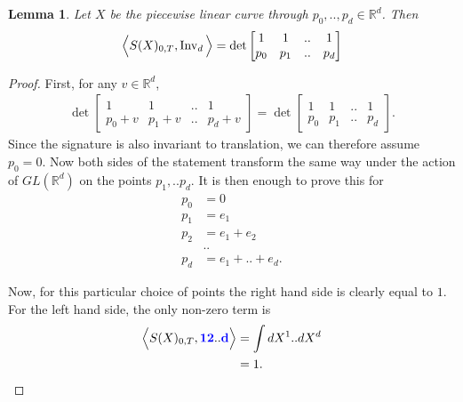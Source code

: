 \documentclass{scrartcl}
\theoremstyle{plain}
\newtheorem{lemma}[theorem]{Lemma}
\theoremstyle{definition}
\newcommand{\R}{\mathbb{R}}
\newcommand{\1}[1]{1_{\{#1\}}}
\newcommand{\ds}{d} %
\def\word#1{{\color{blue}\mathbf{#1}}}
\begin{document}
\begin{lemma}
  \label{lem:invariantVolume}
  Let $X$ be the piecewise linear curve
  through $p_0,..,p_{\ds} \in \R^\ds$.
  Then
  \begin{align*}
    \Big\langle S(X)_{0,T}, \firstInvariant\ds \Big\rangle
    =
   \det\left[
     \begin{matrix}
       1 & 1 & .. & 1 \\
       p_0 & p_1 & .. & p_{\ds}
     \end{matrix}
   \right]
  \end{align*}
\end{lemma}
\begin{proof}
  First, for any $v \in \R^\ds$,
  \begin{align*}
   \det\left[
     \begin{matrix}
       1 & 1 & .. & 1 \\
       p_0 + v & p_1 + v & .. & p_{\ds} + v
     \end{matrix}
   \right]
   =
   \det\left[
     \begin{matrix}
       1 & 1 & .. & 1 \\
       p_0 & p_1 & .. & p_{\ds}
     \end{matrix}
   \right].
  \end{align*}
  Since the signature is also invariant to translation, we can therefore assume $p_0 = 0$.
  Now both sides of the statement transform the same way under the action of $GL(\R^d)$ on
  the points $p_1,..p_\ds$.
  It is then enough to prove this for
  \begin{align*}
    p_0 &= 0 \\
    p_1 &= e_1 \\
    p_2 &= e_1 + e_2 \\
        &.. \\
    p_{\ds} &= e_1 + .. + e_\ds.
  \end{align*}

  Now, for this particular choice of points the right hand side is clearly equal to $1$.
  For the left hand side, the only non-zero term is
  \begin{align*}
    \Big\langle S(X)_{0,T}, \word{12} .. \word{d} \Big\rangle
    &=
    \int dX^1 .. dX^d \\
    &= 1.
  \end{align*}
\end{proof}
\end{document}
